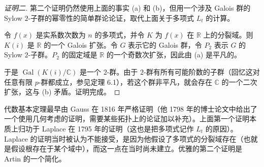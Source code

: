 \begin{proof}[证明二]
第二个证明仍然使用上面的事实 (a) 和 (b)，但用一个涉及 Galois 群的 Sylow $2$-子群的幂零性的简单群论论证，取代上面关于多项式 $L_t$ 的计算。

令 $f(x)$ 是实系数次数为 $n$ 的多项式，并令 $K$ 为 $f(x)$ 在 $\mathbb R$ 上的分裂域。则 $K(i)$ 是 $\mathbb R$ 的一个 Galois 扩张。令 $G$ 表示它的 Galois 群，令 $P_2$ 表示 $G$ 的 Sylow $2$-子群。$P_2$ 的固定域是 $\mathbb R$ 的一个奇数次扩张，因此由 (a) 是平凡的。

于是 $\operatorname{Gal}(K(i)/\mathbb C)$ 是一个 $2$-群。由于 $2$-群有所有可能阶数的子群（回忆这对任意有限 $p$-群都成立，参见定理 6.1），若这个群非平凡，就会存在 $\mathbb C$ 的一个二次扩张，这与 (b) 矛盾。证明完成。
\end{proof}

代数基本定理最早由 Gauss 在 1816 年严格证明（他 1798 年的博士论文中给出了一个使用几何考虑的证明，需要某些拓扑上的论证加以补充）。上面第一个证明本质上归功于 Laplace 在 1795 年的证明（这也是把多项式记作 $L_t$ 的原因）。Laplace 的证明当时被认为不能接受，是因为他假设了多项式的分裂域存在（也就是假设根存在于某个域中），而这一点在当时尚未建立。优雅的第二个证明是 Artin 的一个简化。


